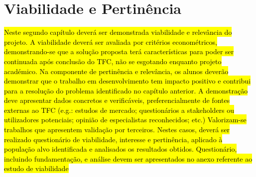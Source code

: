 \chapter{Viabilidade e Pertinência}

\hl{Neste segundo capítulo deverá ser demonstrada viabilidade e relevância do projeto. A viabilidade deverá ser avaliada por critérios econométricos, demonstrando-se que a solução proposta terá características para poder ser continuada após conclusão do TFC, não se esgotando enquanto projeto académico. 
Na componente de pertinência e relevância, os alunos deverão demonstrar que o trabalho em desenvolvimento tem impacto positivo e contribui para a resolução do problema identificado no capítulo anterior. A demonstração deve apresentar dados concretos e verificáveis, preferencialmente de fontes externas ao TFC (e.g.: estudos de mercado; questionários a stakeholders ou utilizadores potenciais; opinião de especialistas reconhecidos; etc.) 
Valorizam-se trabalhos que apresentem validação por terceiros. Nestes casos, deverá ser realizado questionário de viabilidade, interesse e pertinência, aplicado à população alvo identificada e analisados os resultados obtidos. Questionário, incluindo fundamentação, e análise devem ser apresentados no anexo referente ao estudo de viabilidade}